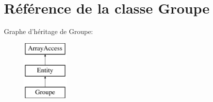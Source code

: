 \hypertarget{class_library_1_1_entities_1_1_groupe}{\section{Référence de la classe Groupe}
\label{class_library_1_1_entities_1_1_groupe}
}
Graphe d'héritage de Groupe\+:\begin{figure}[H]
\begin{center}
\leavevmode
\includegraphics[height=3.000000cm]{class_library_1_1_entities_1_1_groupe}
\end{center}
\end{figure}
